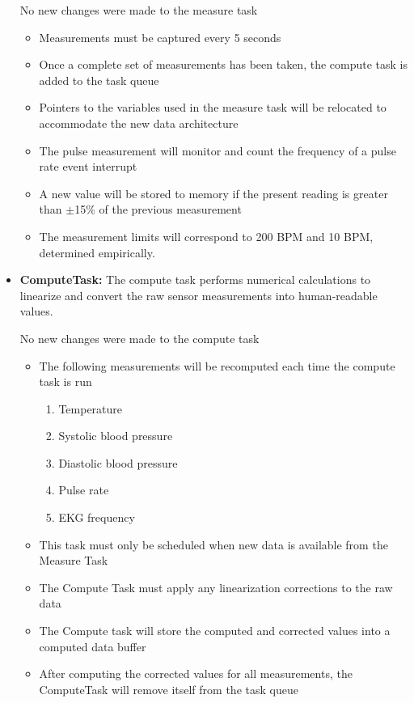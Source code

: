 \documentclass[12pt]{article} %
\begin{document}
\begin{itemize}
		No new changes were made to the measure task
    \begin{itemize}
			\item Measurements must be captured every 5 seconds
      \item Once a complete set of measurements has been taken, the compute
	task is added to the task queue
      \item Pointers to the variables used in the measure task will be
	relocated to accommodate the new data architecture
      \item The pulse measurement will monitor and count the frequency of a
	pulse rate event interrupt
      \item A new value will be stored to memory if the present reading is
	greater than $\pm$15\% of the previous measurement
      \item The measurement limits will correspond to 200 BPM and 10 BPM,
	determined empirically. 
    \end{itemize}

	\item \textbf{ComputeTask:}
		The compute task performs numerical calculations to linearize and convert
		the raw sensor measurements into human-readable values.
		
		No new changes were made to the compute task
    \begin{itemize}
      \item The following measurements will be recomputed each time the compute task is run
				\begin{enumerate}
					\item Temperature
					\item Systolic blood pressure
					\item Diastolic blood pressure
					\item Pulse rate
					\item EKG frequency
				\end{enumerate}
			\item This task must only be scheduled when new data is available from
				the Measure Task
			\item The Compute Task must apply any linearization corrections to the
				raw data
			\item The Compute task will store the computed and corrected values into
				a computed data buffer
			\item After computing the corrected values for all measurements, the
	ComputeTask will remove itself from the task queue
    \end{itemize}


\end{itemize}
\end{document}
